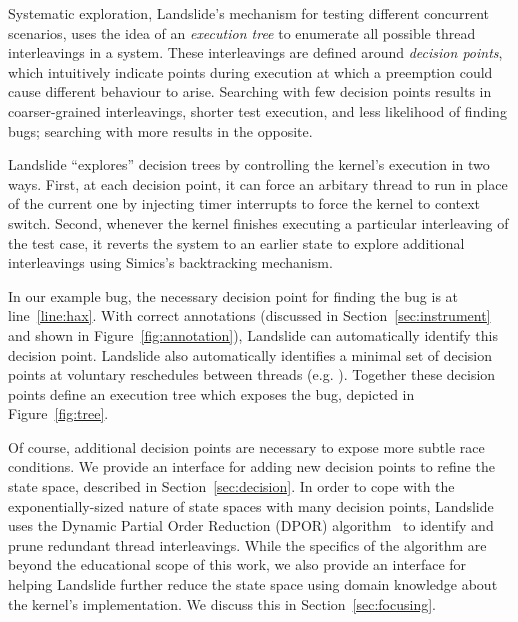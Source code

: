Systematic exploration, Landslide's mechanism for testing different concurrent scenarios, uses the idea of an {\em execution tree} to enumerate all possible thread interleavings in a system. These interleavings are defined around {\em decision points}, which intuitively indicate points during execution at which a preemption could cause different behaviour to arise.
Searching with few decision points results in coarser-grained interleavings, shorter test execution, and less likelihood of finding bugs; searching with more results in the opposite.

Landslide ``explores'' decision trees by controlling the kernel's execution in two ways.
First, at each decision point, it can force an arbitary thread to run in place of the current one by injecting timer interrupts to force the kernel to context switch.
Second, whenever the kernel finishes executing a particular interleaving of the test case, it reverts the system to an earlier state to explore additional interleavings using Simics's backtracking mechanism.

In our example bug, the necessary decision point for finding the bug is at line~\ref{line:hax}. With correct annotations (discussed in Section~\ref{sec:instrument} and shown in Figure~\ref{fig:annotation}), Landslide can automatically identify this decision point.
Landslide also automatically identifies a minimal set of decision points at voluntary reschedules between threads (e.g. ). Together these decision points define an execution tree which exposes the bug, depicted in Figure~\ref{fig:tree}.

Of course, additional decision points are necessary to expose more subtle race conditions. We provide an interface for adding new decision points to refine the state space, described in Section~\ref{sec:decision}.
In order to cope with the exponentially-sized nature of state spaces with many decision points, Landslide uses the Dynamic Partial Order Reduction (DPOR) algorithm~\cite{dpor} to identify and prune redundant thread interleavings.
While the specifics of the algorithm are beyond the educational scope of this work, we also provide an interface for helping Landslide further reduce the state space using domain knowledge about the kernel's implementation. We discuss this in Section~\ref{sec:focusing}.


